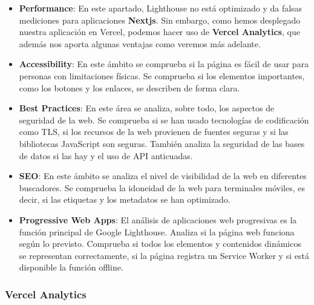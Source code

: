 \documentclass[12pt,twoside,titlepage]{report}
\begin{document}
\begin{itemize}
    \item \textbf{Performance}: En este apartado, Lighthouse no está optimizado y da falsas mediciones para aplicaciones \textbf{Nextjs}. Sin embargo, como hemos desplegado nuestra aplicación en Vercel, podemos hacer uso de \textbf{Vercel Analytics}, que además nos aporta algunas ventajas como veremos más adelante.
    \item \textbf{Accessibility}: En este ámbito se comprueba si la página es fácil de usar para personas con limitaciones físicas. Se comprueba si los elementos importantes, como los botones y los enlaces, se describen de forma clara.

    \item \textbf{Best Practices}: En este área se analiza, sobre todo, los aspectos de seguridad de la web. Se comprueba si se han usado tecnologías de codificación como TLS, si los recursos de la web provienen de fuentes seguras y si las bibliotecas JavaScript son seguras. También analiza la seguridad de las bases de datos si las hay y el uso de API anticuadas.
    \item \textbf{SEO}: En este ámbito se analiza el nivel de visibilidad de la web en diferentes buscadores. Se comprueba la idoneidad de la web para terminales móviles, es decir, si las etiquetas y los metadatos se han optimizado.
    \item \textbf{Progressive Web Apps}: El análisis de aplicaciones web progresivas es la función principal de Google Lighthouse. Analiza si la página web funciona según lo previsto. Comprueba si todos los elementos y contenidos dinámicos se representan correctamente, si la página registra un Service Worker y si está disponible la función offline.
\end{itemize}

\subsubsection{Vercel Analytics}
\label{sec:analytics}
\end{document}
